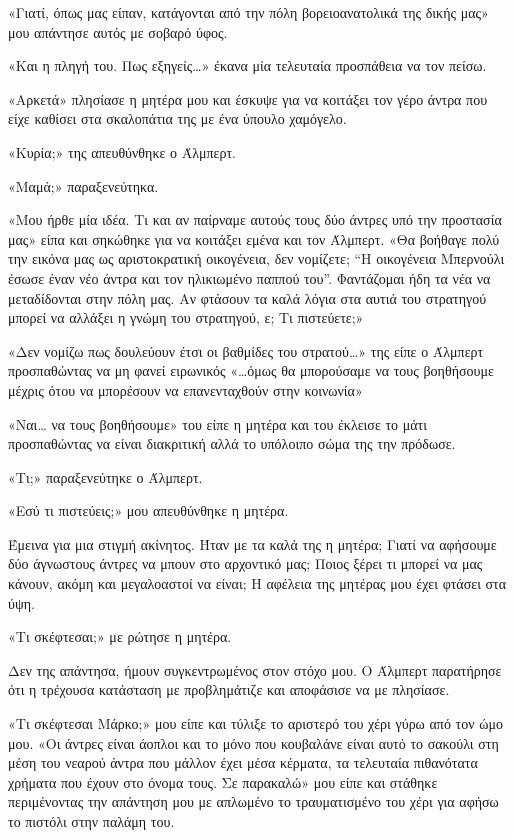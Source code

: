 \documentclass[12pt,twoside, openany]{book}
\begin{document}
«Γιατί, όπως μας είπαν, κατάγονται από την πόλη βορειοανατολικά της δικής μας» μου απάντησε αυτός με σοβαρό ύφος.

«Και η πληγή του. Πως εξηγείς…» έκανα μία τελευταία προσπάθεια να τον πείσω.

«Αρκετά» πλησίασε η μητέρα μου και έσκυψε για να κοιτάξει τον γέρο άντρα που είχε καθίσει στα σκαλοπάτια της με ένα ύπουλο χαμόγελο.

«Κυρία;» της απευθύνθηκε ο Άλμπερτ.

«Μαμά;» παραξενεύτηκα.

«Μου ήρθε μία ιδέα. Τι και αν παίρναμε αυτούς τους δύο άντρες υπό την προστασία μας» είπα και σηκώθηκε για να κοιτάξει εμένα και τον Άλμπερτ. «Θα βοήθαγε πολύ την εικόνα μας ως αριστοκρατική οικογένεια, δεν νομίζετε; “Η οικογένεια Μπερνούλι έσωσε έναν νέο άντρα και τον ηλικιωμένο παππού του”. Φαντάζομαι ήδη τα νέα να μεταδίδονται στην πόλη μας. Αν φτάσουν τα καλά λόγια στα αυτιά του στρατηγού μπορεί να αλλάξει η γνώμη του στρατηγού, ε; Τι πιστεύετε;»

«Δεν νομίζω πως δουλεύουν έτσι οι βαθμίδες του στρατού…» της είπε ο Άλμπερτ προσπαθώντας να μη φανεί ειρωνικός «…όμως θα μπορούσαμε να τους βοηθήσουμε μέχρις ότου να μπορέσουν να επανενταχθούν στην κοινωνία»

«Ναι… να τους βοηθήσουμε» του είπε η μητέρα και του έκλεισε το μάτι προσπαθώντας να είναι διακριτική αλλά το υπόλοιπο σώμα της την πρόδωσε.

«Τι;» παραξενεύτηκε ο Άλμπερτ.

«Εσύ τι πιστεύεις;» μου απευθύνθηκε η μητέρα.

Έμεινα για μια στιγμή ακίνητος. Ήταν με τα καλά της η μητέρα; Γιατί να αφήσουμε δύο άγνωστους άντρες να μπουν στο αρχοντικό μας; Ποιος ξέρει τι μπορεί να μας κάνουν, ακόμη και μεγαλοαστοί να είναι; Η αφέλεια της μητέρας μου έχει φτάσει στα ύψη.

«Τι σκέφτεσαι;» με ρώτησε η μητέρα.

Δεν της απάντησα, ήμουν συγκεντρωμένος στον στόχο μου. Ο Άλμπερτ παρατήρησε ότι η τρέχουσα κατάσταση με προβλημάτιζε και αποφάσισε να με πλησίασε.

«Τι σκέφτεσαι Μάρκο;» μου είπε και τύλιξε το αριστερό του χέρι γύρω από τον ώμο μου. «Οι άντρες είναι άοπλοι και το μόνο που κουβαλάνε είναι αυτό το σακούλι στη μέση του νεαρού άντρα που μάλλον έχει μέσα κέρματα, τα τελευταία πιθανότατα χρήματα που έχουν στο όνομα τους. Σε παρακαλώ» μου είπε και στάθηκε περιμένοντας την απάντηση μου με απλωμένο το τραυματισμένο του χέρι για αφήσω το πιστόλι στην παλάμη του.
\end{document}
